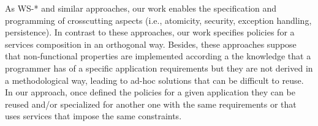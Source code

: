 As WS-* and similar approaches, our work enables the specification and programming of crosscutting aspects (i.e., atomicity, security, exception handling, persistence).
In contrast to these approaches, our work specifies policies for a services composition in an orthogonal way. Besides, these approaches suppose that non-functional properties are implemented according a the knowledge that a programmer has of a specific application requirements but they are not derived in a methodological way, leading to ad-hoc solutions that can be difficult to reuse. In our approach, once defined the policies for a given application they can be reused and/or specialized for another one with the same requirements or that uses services that impose the same constraints.